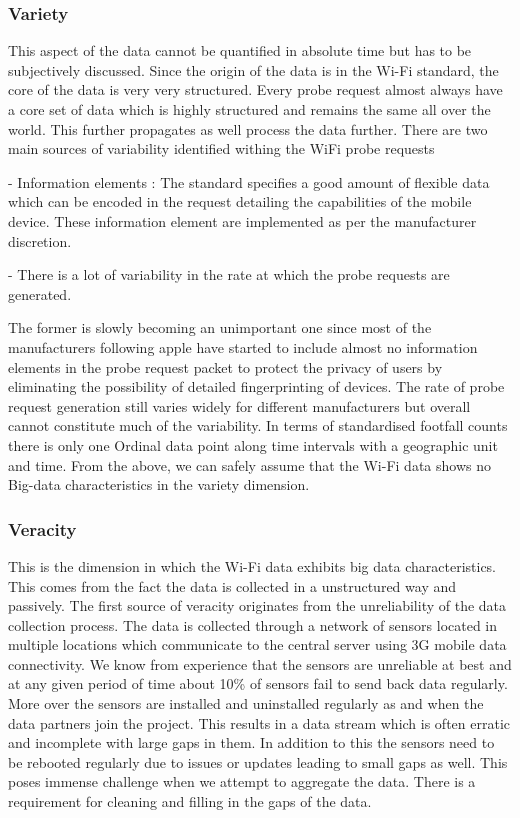 \subsubsection{Variety}

This aspect of the data cannot be quantified in absolute time but has to be subjectively discussed.
Since the origin of the data is in the Wi-Fi standard, the core of the data is very very structured.
Every probe request almost always have a core set of data which is highly structured and remains the same all over the world.
This further propagates as well process the data further.
There are two main sources of variability identified withing the WiFi probe requests

 - Information elements : The standard specifies a good amount of flexible data  which can be encoded in the request detailing the capabilities of the mobile  device.
These information element are implemented as per the manufacturer  discretion.

 - There is a lot of variability in the rate at which the probe requests are  generated.

The former is slowly becoming an unimportant one since most of the manufacturers following apple have started to include almost no information elements in the probe request packet to protect the privacy of users by eliminating the possibility of detailed fingerprinting of devices.
The rate of probe request generation still varies widely for different manufacturers but overall cannot constitute much of the variability.
In terms of standardised footfall counts there is only one Ordinal data point along time intervals with a geographic unit and time.
From the above, we can safely assume that the Wi-Fi data shows no Big-data characteristics in the variety dimension.

\subsubsection{Veracity}

This is the dimension in which the Wi-Fi data exhibits big data characteristics.
This comes from the fact the data is collected in a unstructured way and passively.
The first source of veracity originates from the unreliability of the data collection process.
The data is collected through a network of sensors located in multiple locations which communicate to the central server using 3G mobile data connectivity.
We know from experience that the sensors are unreliable at best and at any given period of time about 10\% of sensors fail to send back data regularly.
More over the sensors are installed and uninstalled regularly as and when the data partners join the project.
This results in a data stream which is often erratic and incomplete with large gaps in them.
In addition to this the sensors need to be rebooted regularly due to issues or updates leading to small gaps as well.
This poses immense challenge when we attempt to aggregate the data.
There is a requirement for cleaning and filling in the gaps of the data.

